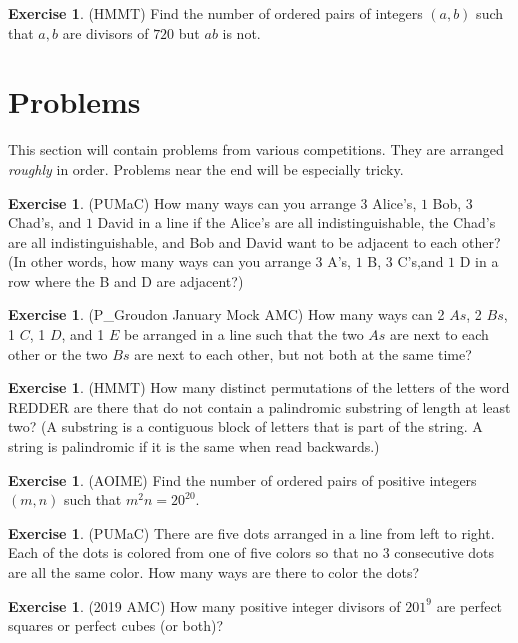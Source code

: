 \documentclass[letterpaper]{article}
\theoremstyle{remark}
\theoremstyle{definition}
\newtheorem{exercise}[thm]{Exercise}
\begin{document}
\begin{exercise}
(HMMT) Find the number of ordered pairs of integers $(a, b)$ such that $a, b$ are divisors of $720$ but $ab$ is not.
\end{exercise}

\section{Problems}
This section will contain problems from various competitions. They are arranged \textit{roughly} in order. Problems near the end will be especially tricky.

\begin{exercise}
(PUMaC) How many ways can you arrange $3$ Alice’s, $1$ Bob, $3$ Chad’s, and $1$ David in a line if the Alice’s are all indistinguishable, the Chad’s are all indistinguishable, and Bob and David want to be adjacent to each other? (In other words, how many ways can you arrange $3$ A’s, $1$ B, $3$ C’s,and $1$ D in a row where the B and D are adjacent?)
\end{exercise}

\begin{exercise}
(P\_Groudon January Mock AMC) How many ways can 2 $As$, 2 $Bs$, 1 $C$, 1 $D$, and 1 $E$ be arranged in a line such that the two $As$ are next to each other or the two $Bs$ are next to each other, but not both at the same time?
\end{exercise}

\begin{exercise}
(HMMT) How many distinct permutations of the letters of the word REDDER are there that do not contain a palindromic substring of length at least two? (A substring is a contiguous block of letters that is part of the string. A string is palindromic if it is the same when read backwards.)
\end{exercise}

\begin{exercise}
(AOIME) Find the number of ordered pairs of positive integers $(m,n)$ such that ${m^2n = 20 ^{20}}$.
\end{exercise}

\begin{exercise}
(PUMaC) There are five dots arranged in a line from left to right. Each of the dots is colored from one of five colors so that no $3$ consecutive dots are all the same color. How many ways are there to color the dots?
\end{exercise}

\begin{exercise}
(2019 AMC) How many positive integer divisors of $201^9$ are perfect squares or perfect cubes (or both)?
\end{exercise}
\end{document}
